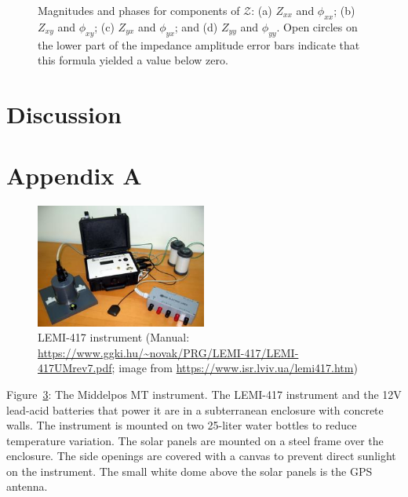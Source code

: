 \documentclass[draft,linenumbers]{agujournal2018}
\begin{document}
\begin{figure}
  \caption{Magnitudes and phases for components of $\boldsymbol{\mathcal{Z}}$: (a) $Z_{xx}$ and $\phi_{xx}$; (b) $Z_{xy}$ and $\phi_{xy}$; (c) $Z_{yx}$ and $\phi_{yx}$; and (d) $Z_{yy}$ and $\phi_{yy}$. Open circles on the lower part of the impedance amplitude error bars indicate that this formula yielded a value below zero.}
 
\label{fig:z}
\end{figure}

\begin{figure}
  
  \caption{}
 
\label{fig:se}
\end{figure}

\clearpage

\section{Discussion}

\section{Appendix A}

\begin{figure}[h]
  \centering
  \includegraphics[width=0.5\textwidth]{figures/LEMI-417.jpg}
  \caption{LEMI-417 instrument (Manual: \url{https://www.ggki.hu/~novak/PRG/LEMI-417/LEMI-417UMrev7.pdf}; image from \url{https://www.isr.lviv.ua/lemi417.htm})}
  \label{fig:lemi}
\end{figure}

Figure~\ref{fig:lemi}: The Middelpos MT instrument. The LEMI-417 instrument and the 12V lead-acid batteries that power it are in a subterranean enclosure with concrete walls. The instrument is mounted on two 25-liter water bottles to reduce temperature variation. The solar panels are mounted on a steel frame over the enclosure. The side openings are covered with a canvas to prevent direct sunlight on the instrument. The small white dome above the solar panels is the GPS antenna.
\end{document}
